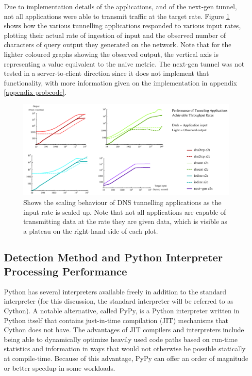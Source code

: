 \documentclass[12pt]{report}
\theoremstyle{remark}
\theoremstyle{definition}
\theoremstyle{definition}
\theoremstyle{definition}
\begin{document}
Due to implementation details of the applications, and of the next-gen tunnel,
not all applications were able to transmit traffic at the target rate. Figure
\ref{tunrates} shows how the various tunnelling applications responded to
various input rates, plotting their actual rate of ingestion of input and the
observed number of characters of query output they generated on the network.
Note that for the lighter coloured graphs showing the observed output, the
vertical axis is representing a value equivalent to the naive metric. The
next-gen tunnel was not tested in a server-to-client direction since it does not
implement that functionality, with more information given on the implementation
in appendix \ref{appendix-probcode}.

\begin{figure}
\centering
\includegraphics[width=\textwidth]{../figures/tunrates.pdf}
\caption[DNS Tunneling Application Throughput Scaling]{Shows the scaling
behaviour of DNS tunnelling applications as the input rate is scaled up. Note
that not all applications are capable of transmitting data at the rate they are
given data, which is visible as a plateau on the right-hand-side of each plot.}
\label{tunrates}
\end{figure}

\subsection{Detection Method and Python Interpreter Processing Performance}
\label{processing-perf}
Python has several interpreters available freely in addition to the standard
interpreter (for this discussion, the standard interpreter will be referred to
as Cython). A notable alternative, called PyPy, is a Python interpreter written
in Python itself that contains just-in-time compilation (JIT) mechanisms that
Cython does not have. The advantages of JIT compilers and interpreters include
being able to dynamically optimize heavily used code paths based on run-time
statistics and information in ways that would not otherwise be possible statically
at compile-time. Because of this advantage, PyPy can offer an order of magnitude
or better speedup\cite{pypyvc-strfmt} in some workloads.
\end{document}
